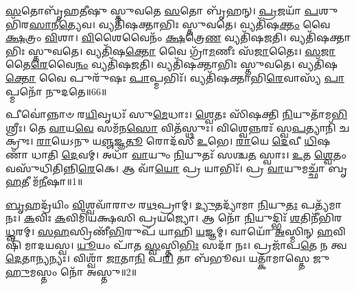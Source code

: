 \-\ul{𑌸}\-𑌤𑍋𑌬𑍃᳴𑌹𑌤𑍀𑌷𑍁 𑌸𑍍𑌤𑍁𑌵𑌤𑍇 \ul{𑌸}\-𑌤𑍋 𑌬𑍃᳴𑌹𑌨𑍍।
\-\ul{𑌪𑍍𑌰}\-𑌜𑌯𑌾᳴ \ul{𑌪}\-𑌶𑍁𑌭𑌿᳴𑌰\-\ul{𑌸𑌾}\-𑌨𑍀\-\ul{𑌤𑍍𑌯𑍇}\-𑌵।
𑌵𑍍𑌯𑌤𑌿᳴𑌷𑌕𑍍𑌤𑌾𑌭𑌿𑌃 𑌸𑍍𑌤𑍁𑌵𑌤𑍇।
𑌵𑍍𑌯𑌤𑌿᳴𑌷\-\ul{𑌕𑍍𑌤𑌂} 𑌵𑍈 \ul{𑌕𑍍𑌷}\-𑌤𑍍𑌰𑌂 \ul{𑌵𑌿}\-𑌶𑌾।
\-\ul{𑌵𑌿}\-𑌶𑍈𑌵𑍈𑌨𑌂᳴ \ul{𑌕𑍍𑌷}\-𑌤𑍍𑌰𑍇\-\ul{𑌣} 𑌵𑍍𑌯𑌤𑌿᳴𑌷𑌜𑌤𑌿।
𑌵𑍍𑌯𑌤𑌿᳴𑌷𑌕𑍍𑌤𑌾𑌭𑌿𑌃 𑌸𑍍𑌤𑍁𑌵𑌤𑍇।
𑌵𑍍𑌯𑌤𑌿᳴𑌷\-\ul{𑌕𑍍𑌤𑍋} 𑌵𑍈 𑌗𑍍𑌰𑌾᳴\-\ul{𑌮}\-𑌣𑍀𑌃 𑌸᳴\-\ul{𑌜𑌾}\-𑌤𑍈𑌃।
\-\ul{𑌸}\-\-\ul{𑌜𑌾}\-𑌤𑍈\-\ul{𑌰𑍇}\-𑌵𑍈\-\ul{𑌨𑌂} 𑌵𑍍𑌯𑌤𑌿᳴𑌷𑌜𑌤𑌿।
𑌵𑍍𑌯𑌤𑌿᳴𑌷𑌕𑍍𑌤𑌾𑌭𑌿𑌃 𑌸𑍍𑌤𑍁𑌵𑌤𑍇।
𑌵𑍍𑌯𑌤𑌿᳴𑌷\-\ul{𑌕𑍍𑌤𑍋} 𑌵𑍈 𑌪𑍁𑌰𑍁᳴𑌷𑌃 \ul{𑌪𑌾}\-𑌪𑍍𑌮𑌭𑌿𑌃᳴।
𑌵𑍍𑌯𑌤𑌿᳴𑌷𑌕𑍍𑌤𑌾𑌭𑌿\-\ul{𑌰𑍇}\-𑌵𑌾𑌸𑍍𑌯᳴ \ul{𑌪𑌾}\-𑌪𑍍𑌮𑌨𑍋᳴ 𑌨𑍁𑌦𑌤𑍇॥66॥\anuvakamend[𑌵𑍇\-\ul{𑌦} 𑌹𑌰᳴𑌨𑍍𑌤𑍍𑌯𑍇𑌨\-\ul{𑌮𑍇}\-𑌵𑌂 𑌵𑍇\-\ul{𑌦𑌾}\-𑌭𑍍𑌯𑍂᳴𑌢𑌃 \ul{𑌪𑌾}\-𑌪𑍍𑌮\-\ul{𑌭𑌿}\-𑌰𑍇𑌕𑌂᳴ 𑌚]




\clearpage
{}
\setcounter{anuvakam}{0}

𑌪𑍀𑌵𑍋॑𑌨𑍍𑌨𑌾𑍞 𑌰\-\ul{𑌯𑌿}\-𑌵𑍃𑌧𑌃᳴ 𑌸𑍁\-\ul{𑌮𑍇}\-𑌧𑌾𑌃।
\-\ul{𑌶𑍍𑌵𑍇}\-𑌤𑌃 𑌸𑌿᳴𑌷𑌕𑍍𑌤𑌿 \ul{𑌨𑌿}\-𑌯𑍁𑌤𑌾᳴\-𑌮\-\ul{𑌭𑌿}\-𑌶𑍍𑌰𑍀𑌃।
𑌤𑍇 \ul{𑌵𑌾}\-𑌯\-\ul{𑌵𑍇} 𑌸𑌮᳴𑌨\-\ul{𑌸𑍋} 𑌵𑌿𑌤᳴𑌸𑍍𑌥𑍁𑌃।
𑌵𑌿𑌶𑍍𑌵𑍇𑌨𑍍𑌨𑌰𑌃᳴ 𑌸𑍍𑌵\-\ul{𑌪}\-𑌤𑍍𑌯𑌾𑌨𑌿᳴ 𑌚𑌕𑍍𑌰𑍁𑌃।
\-\ul{𑌰𑌾}\-𑌯𑍇𑌽𑌨𑍁 𑌯\-\ul{𑌞𑍍𑌜}\-𑌜𑍍𑌞\-\ul{𑌤𑍂} 𑌰𑍋𑌦᳴𑌸𑍀 \ul{𑌉}\-𑌭𑍇।
\-\ul{𑌰𑌾}\-𑌯𑍇 \ul{𑌦𑍇}\-𑌵𑍀 \ul{𑌧𑌿}\-𑌷𑌣𑌾᳴ 𑌧𑌾𑌤𑌿 \ul{𑌦𑍇}\-𑌵𑌮𑍍।
𑌅𑌧𑌾᳴ \ul{𑌵𑌾}\-𑌯𑍁𑌂 \ul{𑌨𑌿}\-𑌯𑍁𑌤𑌃᳴ 𑌸𑌶𑍍𑌚\-\ul{𑌤} 𑌸𑍍𑌵𑌾𑌃।
\-\ul{𑌉}\-𑌤 \ul{𑌶𑍍𑌵𑍇}\-𑌤𑌂 𑌵𑌸𑍁᳴𑌧𑌿𑌤𑌿𑌨𑍍𑌨𑌿\-\ul{𑌰𑍇}\-𑌕𑍇।
𑌆 𑌵𑌾᳴\-\ul{𑌯𑍋} 𑌪𑍍𑌰 𑌯𑌾𑌭𑌿𑌃᳴।
𑌪𑍍𑌰 \ul{𑌵𑌾}\-𑌯𑍁𑌮𑌚𑍍𑌛𑌾᳴ 𑌬𑍃\-\ul{𑌹}\-𑌤𑍀 𑌮᳴\-\ul{𑌨𑍀}\-𑌷𑌾॥1॥

\-\ul{𑌬𑍃}\-𑌹𑌦𑍍𑌰᳴𑌯𑌿𑌂 \ul{𑌵𑌿}\-𑌶𑍍𑌵𑌵𑌾᳴𑌰𑌾𑍞 𑌰\-\ul{𑌥}\-𑌪𑍍𑌰𑌾𑌮𑍍।
\-\ul{𑌦𑍍𑌯𑍁}\-𑌤𑌦𑍍𑌯𑌾᳴𑌮𑌾 \ul{𑌨𑌿}\-𑌯𑍁\-\ul{𑌤𑌃} 𑌪𑌤𑍍𑌯᳴𑌮𑌾𑌨𑌃।
\-\ul{𑌕}\-𑌵𑌿𑌃 \ul{𑌕}\-𑌵𑌿𑌮𑌿᳴𑌯𑌕𑍍𑌷𑌸𑌿 𑌪𑍍𑌰𑌯𑌜𑍍𑌯𑍋।
𑌆 𑌨𑍋᳴ \ul{𑌨𑌿}\-𑌯𑍁𑌦𑍍𑌭𑌿𑌃᳴ \ul{𑌶}\-𑌤𑌿𑌨𑍀᳴𑌭𑌿𑌰\-\ul{𑌧𑍍𑌵}\-𑌰𑌮𑍍।
\-\ul{𑌸}\-\-\ul{𑌹}\-𑌸𑍍𑌰𑌿𑌣𑍀᳴\-\ul{𑌭𑌿}\-𑌰𑍁𑌪᳴ 𑌯𑌾𑌹𑌿 \ul{𑌯}\-𑌜𑍍𑌞𑌮𑍍।
𑌵𑌾𑌯𑍋᳴ \ul{𑌅}\-𑌸𑍍𑌮𑌿𑌨𑍍 \ul{𑌹}\-𑌵𑌿𑌷𑌿᳴ 𑌮𑌾𑌦𑌯𑌸𑍍𑌵।
\-\ul{𑌯𑍂}\-𑌯𑌂 𑌪𑌾᳴𑌤 \ul{𑌸𑍍𑌵}\-𑌸𑍍𑌤𑌿\-\ul{𑌭𑌿𑌃} 𑌸𑌦𑌾᳴ 𑌨𑌃।
𑌪𑍍𑌰𑌜𑌾᳴𑌪\-\ul{𑌤𑍇} 𑌨 𑌤𑍍𑌵\-\ul{𑌦𑍇}\-𑌤𑌾\-\ul{𑌨𑍍𑌯}\-𑌨𑍍𑌯𑌃।
𑌵𑌿𑌶𑍍𑌵𑌾᳴ \ul{𑌜𑌾}\-𑌤𑌾\-\ul{𑌨𑌿} 𑌪\-\ul{𑌰𑌿} 𑌤𑌾 𑌬᳴𑌭𑍂𑌵।
𑌯𑌤𑍍𑌕𑌾᳴𑌮𑌾𑌸𑍍𑌤𑍇 𑌜𑍁\-\ul{𑌹𑍁}\-𑌮𑌸𑍍𑌤𑌂 𑌨𑍋᳴ 𑌅𑌸𑍍𑌤𑍁॥2॥

